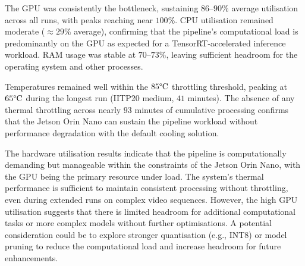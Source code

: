 The GPU was consistently the bottleneck, sustaining $86$--$90\%$ average
utilisation across all runs, with peaks reaching near $100\%$. CPU utilisation
remained moderate ($\approx 29\%$ average), confirming that the pipeline's
computational load is predominantly on the GPU as expected for a
TensorRT-accelerated inference workload. RAM usage was stable at $70$--$73\%$,
leaving sufficient headroom for the operating system and other processes.

Temperatures remained well within the $85\degree\mathrm{C}$ throttling
threshold, peaking at $65\degree\mathrm{C}$ during the longest run (IITP20
medium, $41$ minutes). The absence of any thermal throttling across nearly $93$
minutes of cumulative processing confirms that the Jetson Orin Nano can sustain
the pipeline workload without performance degradation with the default cooling
solution.

The hardware utilisation results indicate that the pipeline is computationally
demanding but manageable within the constraints of the Jetson Orin Nano, with
the GPU being the primary resource under load. The system's thermal performance
is sufficient to maintain consistent processing without throttling, even during
extended runs on complex video sequences. However, the high GPU utilisation
suggests that there is limited headroom for additional computational tasks or
more complex models without further optimisations. A potential consideration
could be to explore stronger quantisation (e.g., INT8) or model pruning to
reduce the computational load and increase headroom for future enhancements.